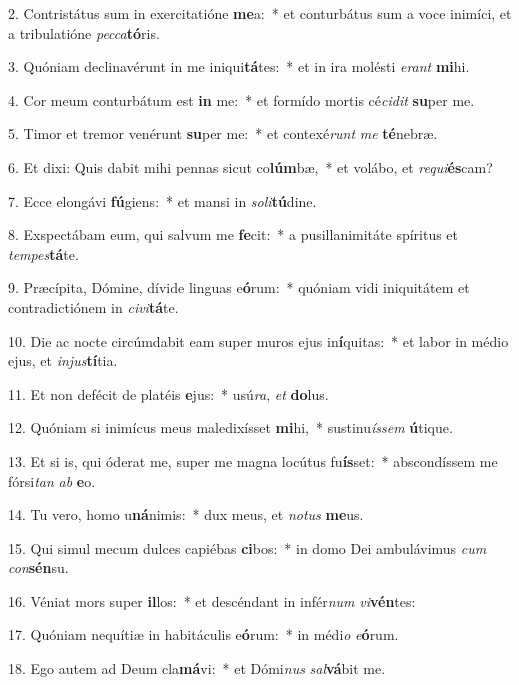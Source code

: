 2. Contristátus sum in exercitatióne \textbf{me}a:~*  et conturbátus sum a voce inimíci, et a tribulatióne \textit{pec}\textit{ca}\textbf{tó}ris.\

3. Quóniam declinavérunt in me iniqui\textbf{tá}tes:~*  et in ira molésti \textit{e}\textit{rant} \textbf{mi}hi.\

4. Cor meum conturbátum est \textbf{in} me:~*  et formído mortis cé\textit{ci}\textit{dit} \textbf{su}per me.\

5. Timor et tremor venérunt \textbf{su}per me:~*  et contexé\textit{runt} \textit{me} \textbf{té}nebræ.\

6. Et dixi: Quis dabit mihi pennas sicut co\textbf{lúm}bæ,~*  et volábo, et \textit{re}\textit{qui}\textbf{és}cam?\

7. Ecce elongávi \textbf{fú}giens:~*  et mansi in \textit{so}\textit{li}\textbf{tú}dine.\

8. Exspectábam eum, qui salvum me \textbf{fe}cit:~*  a pusillanimitáte spíritus et \textit{tem}\textit{pes}\textbf{tá}te.\

9. Præcípita, Dómine, dívide linguas e\textbf{ó}rum:~*  quóniam vidi iniquitátem et contradictiónem in \textit{ci}\textit{vi}\textbf{tá}te.\

10. Die ac nocte circúmdabit eam super muros ejus in\textbf{í}quitas:~*  et labor in médio ejus, et \textit{in}\textit{jus}\textbf{tí}tia.\

11. Et non defécit de platéis \textbf{e}jus:~*  usú\textit{ra}, \textit{et} \textbf{do}lus.\

12. Quóniam si inimícus meus maledixísset \textbf{mi}hi,~*  sustinu\textit{ís}\textit{sem} \textbf{ú}tique.\

13. Et si is, qui óderat me, super me magna locútus fu\textbf{ís}set:~*  abscondíssem me fórsi\textit{tan} \textit{ab} \textbf{e}o.\

14. Tu vero, homo u\textbf{ná}nimis:~*  dux meus, et \textit{no}\textit{tus} \textbf{me}us.\

15. Qui simul mecum dulces capiébas \textbf{ci}bos:~*  in domo Dei ambulávimus \textit{cum} \textit{con}\textbf{sén}su.\

16. Véniat mors super \textbf{il}los:~*  et descéndant in infér\textit{num} \textit{vi}\textbf{vén}tes:\

17. Quóniam nequítiæ in habitáculis e\textbf{ó}rum:~*  in médi\textit{o} \textit{e}\textbf{ó}rum.\

18. Ego autem ad Deum cla\textbf{má}vi:~*  et Dómi\textit{nus} \textit{sal}\textbf{vá}bit me.\

